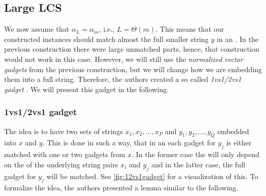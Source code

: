 \subsection{Large LCS}

We now assume that $\alpha_L = \alpha_m$, i.e., $L = \Theta(m)$.
This means that our constructed instances should match almost the full smaller string $y$ in an \lcs{}.
In the previous construction there were large unmatched parts, hence, that construction would not work in this case.
However, we will still use the \emph{normalized vector gadgets} from the previous construction, but we will change how we are embedding them into a full string.
Therefore, the authors created a so called \emph{1vs1/2vs1 gadget} \cite[section 9.2.1]{Bringman.2018}.
We will present this gadget in the following.

\subsubsection{1vs1/2vs1 gadget}
The idea is to have two sets of strings $x_1, x_2, \ldots, x_P$ and $y_1, y_2, \ldots, y_Q$ embedded into $x$ and $y$.
This is done in such a way, that in an \lcs{} each gadget for $y_j$ is either matched with one or two gadgets from $x$.
In the former case the \lcs{} will only depend on the \lcs{} of the underlying string pairs $x_i$ and $y_j$ and in the latter case, the full gadget for $y_j$ will be matched.
See \autoref{fig:12vs1gadget} for a visualization of this.
To formalize the idea, the authors presented a lemma \cite[Lemma 9.6]{Bringman.2018} similar to the following. 











